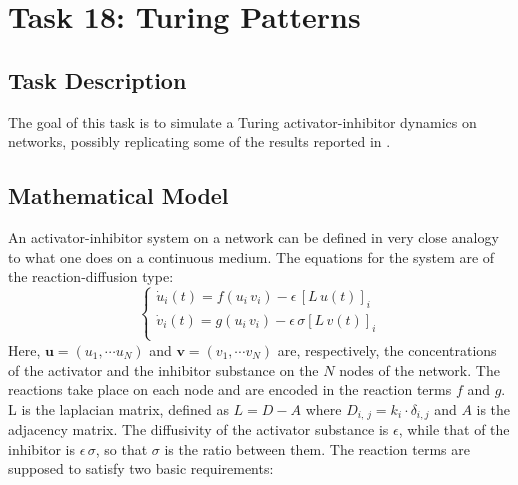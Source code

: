 \chapter{Task 18: Turing Patterns}

\section{Task Description}
The goal of this task is to simulate a Turing activator-inhibitor dynamics on networks, possibly replicating some of the results reported in \cite{main_network}. 
\section{Mathematical Model}
An activator-inhibitor system on a network can be defined in very close analogy to what one does on a continuous medium. 
The equations for the system are of the reaction-diffusion type:
$$
\begin{cases}
\dot{u}_i(t) = f(u_i\, v_i) - \epsilon\,[L\,u(t)]_i \\
\dot{v}_i(t) = g(u_i\, v_i) - \epsilon\, \sigma [L\,v(t)]_i \\
\end{cases}
$$
Here, $\mathbf{u} = (u_1, \cdots u_N)$ and $\mathbf{v} = (v_1, \cdots v_N)$ are, respectively, the concentrations of the activator and the inhibitor substance on the $N$ nodes of the network. The reactions take place on each node and are encoded in the reaction terms $f$ and $g$. L is the laplacian matrix, defined as $L=D-A$ where $D_{i,\,j}=k_i \cdot \delta_{i,j}$ and $A$ is the adjacency matrix. The diffusivity of the activator substance is $\epsilon$, while that of the inhibitor is $\epsilon\,\sigma$, so that $\sigma$ is the ratio between them. The reaction terms are supposed to satisfy two basic requirements:
